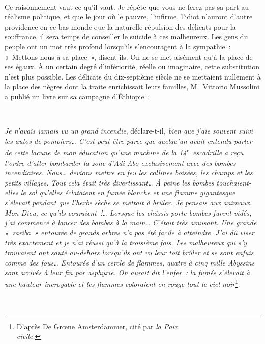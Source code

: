 \documentclass[french,twoside]{book} %
\begin{document}
\noindent  \par
Ce raisonnement vaut ce qu’il vaut. Je répète que vous ne ferez pas sa part au réalisme politique, et que le jour où le pauvre, l’infirme, l’idiot n’auront d’autre providence en ce bas monde que la naturelle répulsion des délicats pour la souffrance, il sera temps de conseiller le suicide à ces malheureux. Les gens du peuple ont un mot très profond lorsqu’ils s’encouragent à la sympathie : « Mettons-nous à sa place », disent-ils. On ne se met aisément qu’à la place de ses égaux. À un certain degré d’infériorité, réelle ou imaginaire, cette substitution n’est plus possible. Les délicats du dix-septième siècle ne se mettaient nullement à la place des nègres dont la traite enrichissait leurs familles, M. Vittorio Mussolini a publié un livre sur sa campagne d’Éthiopie :\par
 \par
\emph{Je n’avais jamais vu un grand incendie}, déclare-t-il\emph{, bien que j’aie souvent suivi les autos de pompiers… C’est peut-être parce que quelqu’un avait entendu parler de cette lacune de mon éducation qu’une machine de la 14\textsuperscript{e} escadrille a reçu l’ordre d’aller bombarder la zone d’Adi-Abo exclusivement avec des bombes incendiaires. Nous… devions mettre en feu les collines boisées, les champs et les petits villages. Tout cela était très divertissant… À peine les bombes touchaient-elles le sol qu’elles éclataient en fumée blanche et une flamme gigantesque s’élevait pendant que l’herbe sèche se mettait à brûler. Je pensais aux animaux. Mon Dieu, ce qu’ils couraient !… Lorsque les châssis porte-bombes furent vidés, j’ai commencé à lancer des bombes à la main… C’était très amusant. Une grande « zariba » entourée de grands arbres n’a pas été facile à atteindre. J’ai dû viser très exactement et je n’ai réussi qu’à la troisième fois. Les malheureux qui s’y trouvaient ont sauté au-dehors lorsqu’ils ont vu leur toit brûler et se sont enfuis comme des fous… Entourés d’un cercle de flammes, quatre à cinq mille Abyssins sont arrivés à leur fin par asphyxie. On aurait dit l’enfer : la fumée s’élevait à une hauteur incroyable et les flammes coloraient en rouge tout le ciel noir}\footnote{D’après De Grœne Amsterdammer, cité par \emph{la Paix} \\
\emph{civile.}}.\par
 \par
\end{document}
